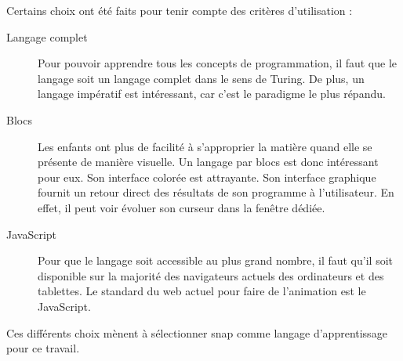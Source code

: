Certains choix ont été faits pour tenir compte des critères d'utilisation :
\begin{description}
  \item[Langage complet] Pour pouvoir apprendre tous les concepts de programmation, il faut que le langage soit un langage complet dans le sens de Turing.  De plus, un langage impératif est intéressant, car c'est le paradigme le plus répandu.
  \item[Blocs] Les enfants ont plus de facilité à s'approprier la matière quand elle se présente de manière visuelle. %
  Un langage par \glspl{bloc} est donc intéressant pour eux. Son interface colorée est attrayante. Son interface graphique fournit un retour direct des résultats de son programme à l'utilisateur. En effet, il peut voir évoluer son curseur dans la fenêtre dédiée.
  \item[JavaScript] Pour que le langage soit accessible au plus grand nombre, il faut qu'il soit disponible sur la majorité des navigateurs actuels des ordinateurs et des tablettes. Le standard du web actuel pour faire de l'animation est le JavaScript.
\end{description}
Ces différents choix mènent à sélectionner \gls{snap} comme langage d'apprentissage pour ce travail.
